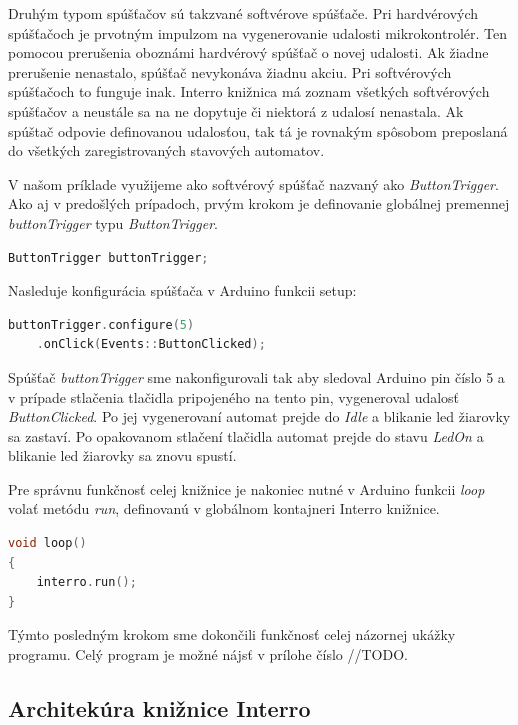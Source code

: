 Druhým typom spúšťačov sú takzvané softvérove spúšťače. Pri hardvérových spúšťačoch je prvotným impulzom na vygenerovanie udalosti mikrokontrolér. Ten pomocou prerušenia
oboznámi hardvérový spúšťač o novej udalosti. Ak žiadne prerušenie nenastalo, spúšťač nevykonáva žiadnu akciu. Pri softvérových spúšťačoch to funguje inak. Interro knižnica
má zoznam všetkých softvérových spúšťačov a neustále sa na ne dopytuje či niektorá z udalosí nenastala. Ak spúštač odpovie definovanou udalosťou,
tak tá je rovnakým spôsobom preposlaná do všetkých zaregistrovaných stavových automatov. \par
V našom príklade využijeme ako softvérový spúšťač nazvaný ako \textit{ButtonTrigger}. Ako aj v predošlých prípadoch, prvým krokom je definovanie globálnej premennej
\textit{buttonTrigger} typu \textit{ButtonTrigger}.

\begin{lstlisting}[language=c++]  
ButtonTrigger buttonTrigger;            
\end{lstlisting}

Nasleduje konfigurácia spúšťača v Arduino funkcii setup:
\begin{lstlisting}[language=c++]  
buttonTrigger.configure(5)
    .onClick(Events::ButtonClicked); 
\end{lstlisting}

Spúšťač \textit{buttonTrigger} sme nakonfigurovali tak aby sledoval Arduino pin číslo 5 a v prípade stlačenia tlačidla pripojeného na tento pin, vygeneroval udalosť
\textit{ButtonClicked}. Po jej vygenerovaní automat prejde do  \textit{Idle} a blikanie led žiarovky sa zastaví. Po opakovanom stlačení tlačidla automat prejde do
stavu \textit{LedOn} a blikanie led žiarovky sa znovu spustí. \par
Pre správnu funkčnosť celej knižnice je nakoniec nutné v Arduino funkcii \textit{loop} volať metódu \textit{run}, definovanú v globálnom kontajneri Interro knižnice.
\begin{lstlisting}[language=c++]  
void loop()
{
    interro.run();
}
\end{lstlisting}

Týmto posledným krokom sme dokončili funkčnosť celej názornej ukážky programu. Celý program je možné nájsť v prílohe číslo //TODO.

\subsection{Architekúra knižnice Interro}

